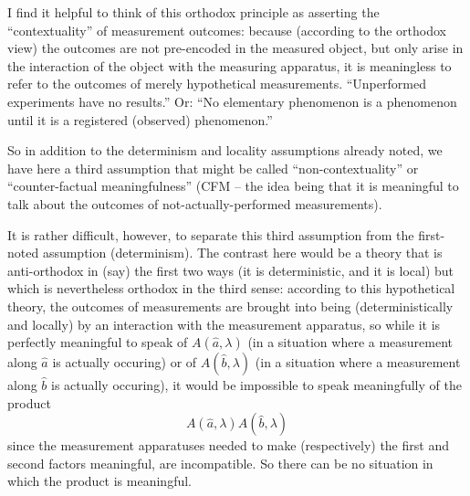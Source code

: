 \documentclass[aps,prc,onecolumn,12pt]{revtex4-2}
\begin{document}
I find it helpful to think of this orthodox principle as asserting the
``contextuality'' of measurement outcomes:  because (according to the
orthodox view) the outcomes are not pre-encoded in the measured object, but
only arise in the interaction of the  object with the measuring
apparatus, it is meaningless to refer to the outcomes of merely
hypothetical measurements.  ``Unperformed experiments have no
results.''\cite{peres}  Or:  ``No elementary phenomenon is a
phenomenon until it is a registered (observed) phenomenon.''\cite{wheeler}  

So in addition to the determinism and locality assumptions already
noted, we have here a third assumption that might be called
``non-contextuality'' or ``counter-factual meaningfulness'' (CFM -- 
the idea being that it is meaningful to talk about the outcomes of
not-actually-performed measurements).

It is rather difficult, however, to separate this third assumption
from the first-noted assumption (determinism).  The contrast here
would be a theory that is anti-orthodox in (say) the first two ways
(it is deterministic, and it is local) but which is nevertheless
orthodox in the third sense:  according to this 
hypothetical theory, the outcomes
of measurements are brought into being (deterministically and locally)
by an interaction with the measurement apparatus, so while it is
perfectly meaningful to speak of $A(\hat{a},\lambda)$ (in a situation
where a measurement along $\hat{a}$ is actually occuring) or of
$A(\hat{b},\lambda)$ (in a situation where a measurement along
  $\hat{b}$ is actually occuring), it would be impossible to speak
  meaningfully of the product
\begin{equation}
A(\hat{a},\lambda) A(\hat{b},\lambda)
\end{equation}
since the measurement apparatuses needed to make (respectively) the
first and second factors meaningful, are incompatible.  So there can
be no situation in which the product is meaningful.
\end{document}
